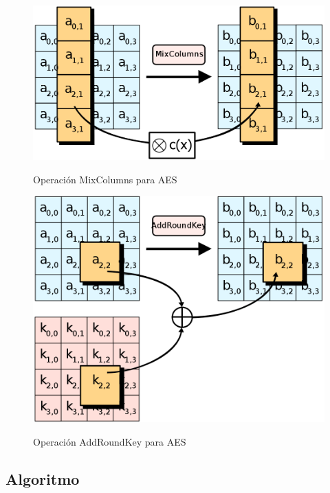  \begin{figure}[ht]
   \centering
   \includegraphics[scale=0.25]{Figures/MixColumns}
   \decoRule
   \caption[MixColumns (AES)]{Operación MixColumns para AES} \emph{\parencite{Reference29}}
   \label{fig:MixColumns}
 \end{figure}

 \begin{figure}[ht]
   \centering
   \includegraphics[scale=0.25]{Figures/AddRoundKey}
   \decoRule
   \caption[AddRoundKey (AES)]{Operación AddRoundKey para AES} \emph{\parencite{Reference30}}
   \label{fig:AddRoundKey}
 \end{figure}

 \emph{\parencite{Reference26}}

 \subsection{Algoritmo}

